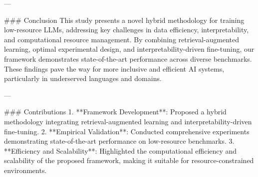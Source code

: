 ---

### Conclusion
This study presents a novel hybrid methodology for training low-resource LLMs, addressing key challenges in data efficiency, interpretability, and computational resource management. By combining retrieval-augmented learning, optimal experimental design, and interpretability-driven fine-tuning, our framework demonstrates state-of-the-art performance across diverse benchmarks. These findings pave the way for more inclusive and efficient AI systems, particularly in underserved languages and domains.

---

### Contributions
1. **Framework Development**: Proposed a hybrid methodology integrating retrieval-augmented learning and interpretability-driven fine-tuning.
2. **Empirical Validation**: Conducted comprehensive experiments demonstrating state-of-the-art performance on low-resource benchmarks.
3. **Efficiency and Scalability**: Highlighted the computational efficiency and scalability of the proposed framework, making it suitable for resource-constrained environments.